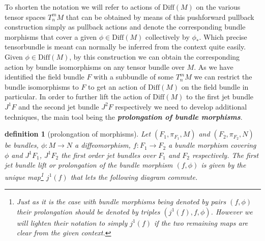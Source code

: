 \documentclass[a4paper,12pt, DIV=14, BCOR=5mm, twoside, headsepline]{scrbook}
\newtheorem{definition}{definition}[section]
\begin{document}
To shorten the notation we will refer to actions of $\mathrm{Diff}(M)$ on the various tensor spaces $T^m_nM$ that can be obtained by means of this pushforward pullback construction simply as pullback actions and denote the corresponding bundle morphisms that cover a given $\phi \in \mathrm{Diff}(M)$ collectively by $\phi_{\ast}$. Which precise tensorbundle is meant can normally be inferred from the context quite easily.\\

Given $\phi \in \mathrm{Diff}(M)$, by this construction we can obtain the corresponding action by bundle isomorphisms on any tensor bundle over $M$. As we have identified the field bundle $F$ with a subbundle of some $T^m_nM$ we can restrict the bundle isomorphisms to $F$ to get an action of $\mathrm{Diff}(M)$ on the field bundle in particular. 
In order to further lift the action of $\mathrm{Diff}(M)$ to the first jet bundle $J^1F$ and the second jet bundle $J^2F$ respectively we need to develop additional techniques, the main tool being the \textbf{\textit{prolongation of bundle morphisms}}. 
\begin{definition}[prolongation of morphisms]
Let $(F_1,\pi_{F_1},M)$ and $(F_2,\pi_{F_2},N)$ be bundles, $\phi : M \rightarrow N$ a diffeomorphism, $f : F_1 \rightarrow F_2$ a bundle morphism covering $\phi$ and $J^1F_1$, $J^1F_2$ the first order jet bundles over $F_1$ and $F_2$ respectively. The first jet bundle lift or prolongation of the bundle morphism $(f,\phi)$ is given by the unique map\footnote{Just as it is the case with bundle morphisms being denoted by pairs $(f,\phi)$ their prolongation should be denoted by triples $(j^1(f),f,\phi)$. However we will lighten their notation to simply $j^1(f)$ if the two remaining maps are clear from the given context.} $j^1(f)$ that lets the following diagram commute.
\begin{center}
\end{center}
\end{definition}
\end{document}
